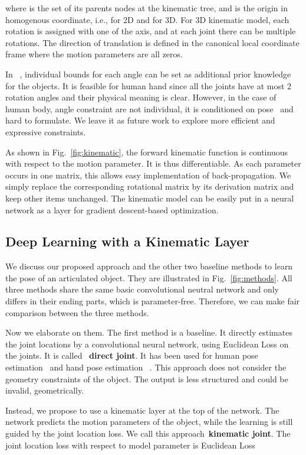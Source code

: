 \documentclass[runningheads]{llncs}
\begin{document}
where  is the set of its parents nodes at the kinematic tree, and  is the origin in homogenous coordinate, i.e.,  for 2D and   for 3D.
For 3D kinematic model, each rotation is assigned with one of the  axis, and at each joint there can be multiple rotations. The direction of translation is defined in the canonical local coordinate frame where the motion parameters are all zeros.

In ~\cite{zhou2016model}, individual bounds for each angle can be set as additional prior knowledge for the objects. It is feasible for human hand since all the joints have at most 2 rotation angles and their physical meaning is clear. However, in the case of human body, angle constraint are not individual, it is conditioned on pose~\cite{akhter2015pose} and hard to formulate. We leave it as future work to explore more efficient and expressive constraints.

As shown in Fig.~\ref{fig:kinematic}, the forward kinematic function is continuous with respect to the motion parameter. It is thus differentiable. As each parameter occurs in one matrix, this allows easy implementation of back-propagation. We simply replace the corresponding rotational matrix by its derivation matrix and keep other items unchanged. The kinematic model can be easily put in a neural network as a layer for gradient descent-based optimization.


\subsection{Deep Learning with a Kinematic Layer}
We discuss our proposed approach and the other two baseline methods to learn the pose of an articulated object. They are illustrated in Fig.~\ref{fig:methods}. All three methods share the same basic convolutional neutral network and only differs in their ending parts, which is parameter-free. Therefore, we can make fair comparison between the three methods.

Now we elaborate on them. The first method is a baseline. It directly estimates the joint locations by a convolutional neural network, using Euclidean Loss on the joints. It is called ~\textbf{direct joint}. It has been used for human pose estimation~\cite{toshev2014deeppose,li20143d} and hand pose estimation ~\cite{oberweger2015hands}. This approach does not consider the geometry constraints of the object. The output is less structured and could be invalid, geometrically.

Instead, we propose to use a kinematic layer at the top of the network. The network predicts the motion parameters of the object, while the learning is still guided by the joint location loss. We call this approach~\textbf{kinematic joint}. The joint location loss with respect to model parameter  is Euclidean Loss
\end{document}
